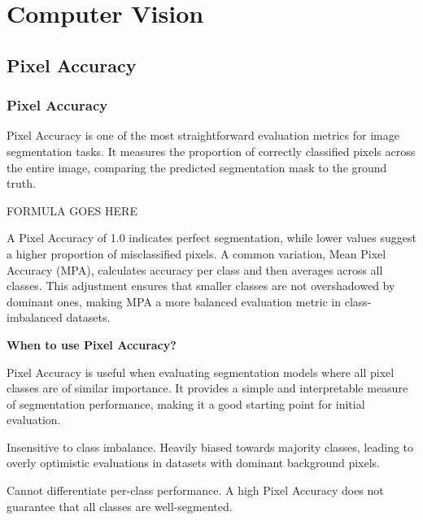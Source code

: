 \chapter{Computer Vision}

\clearpage
\thispagestyle{cvstyle}
\section{Pixel Accuracy}
\subsection{Pixel Accuracy}

Pixel Accuracy is one of the most straightforward evaluation metrics for image segmentation tasks. It measures the proportion
of correctly classified pixels across the entire image, comparing the predicted segmentation mask to the ground truth.

\begin{center}
    FORMULA GOES HERE
\end{center}

A Pixel Accuracy of 1.0 indicates perfect segmentation, while lower values suggest a higher proportion of misclassified pixels.
A common variation, Mean Pixel Accuracy (MPA), calculates accuracy per class and then averages across all classes.
This adjustment ensures that smaller classes are not overshadowed by dominant ones, making MPA a more balanced evaluation
metric in class-imbalanced datasets.

\textbf{When to use Pixel Accuracy?}

Pixel Accuracy is useful when evaluating segmentation models where all pixel classes are of similar importance.
It provides a simple and interpretable measure of segmentation performance, making it a good starting point for initial
evaluation.

{
\item Insensitive to class imbalance. Heavily biased towards majority classes, leading to overly optimistic
evaluations in datasets with dominant background pixels.
\item Cannot differentiate per-class performance. A high Pixel Accuracy does not guarantee that all classes are well-segmented.
}

\clearpage
\thispagestyle{cvstyle}
